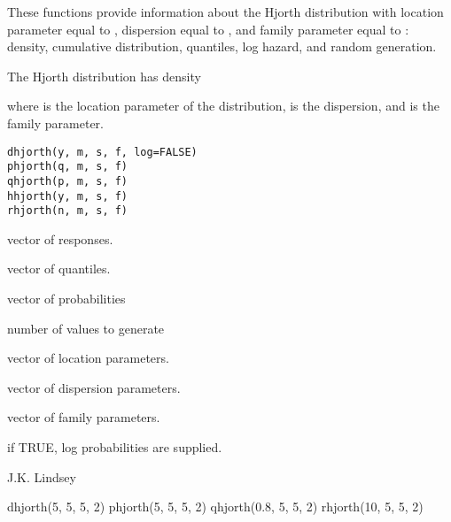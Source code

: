 \begin{Description}\relax
These functions provide information about the Hjorth
distribution with location parameter equal to , dispersion equal
to , and family parameter equal to : density,
cumulative distribution, quantiles, log hazard, and random generation.

The Hjorth distribution has density

where  is the location parameter of the distribution,
 is the dispersion, and  is the family
parameter.
\end{Description}
\begin{Usage}
\begin{verbatim}
dhjorth(y, m, s, f, log=FALSE)
phjorth(q, m, s, f)
qhjorth(p, m, s, f)
hhjorth(y, m, s, f)
rhjorth(n, m, s, f)
\end{verbatim}
\end{Usage}
\begin{Arguments}
\begin{ldescription}
\item[\code{y}] vector of responses.
\item[\code{q}] vector of quantiles.
\item[\code{p}] vector of probabilities
\item[\code{n}] number of values to generate
\item[\code{m}] vector of location parameters.
\item[\code{s}] vector of dispersion parameters.
\item[\code{f}] vector of family parameters.
\item[\code{log}] if TRUE, log probabilities are supplied.
\end{ldescription}
\end{Arguments}
\begin{Author}\relax
J.K. Lindsey
\end{Author}
\begin{Examples}
\begin{ExampleCode}
dhjorth(5, 5, 5, 2)
phjorth(5, 5, 5, 2)
qhjorth(0.8, 5, 5, 2)
rhjorth(10, 5, 5, 2)
\end{ExampleCode}
\end{Examples}

